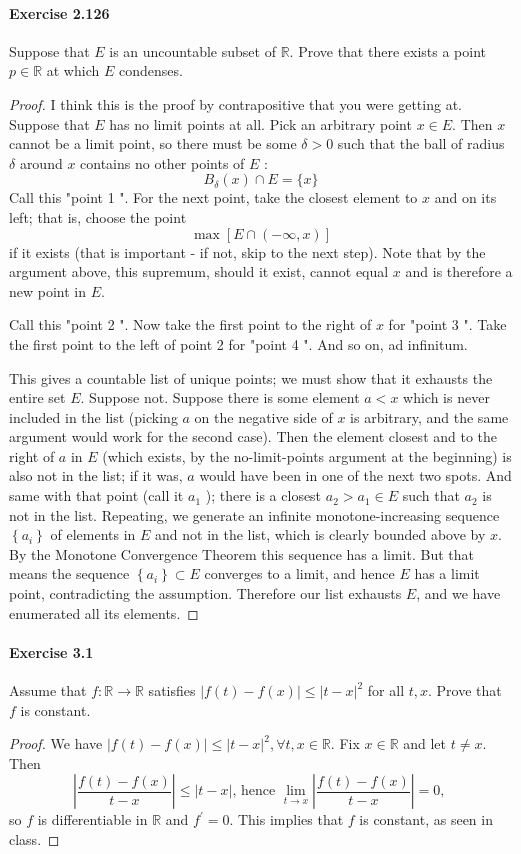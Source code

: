 \documentclass{article}
\begin{document}
\paragraph{Exercise 2.126} Suppose that $E$ is an uncountable subset of $\mathbb{R}$. Prove that there exists a point $p \in \mathbb{R}$ at which $E$ condenses.
\begin{proof}
    I think this is the proof by contrapositive that you were getting at.
Suppose that $E$ has no limit points at all. Pick an arbitrary point $x \in E$. Then $x$ cannot be a limit point, so there must be some $\delta>0$ such that the ball of radius $\delta$ around $x$ contains no other points of $E$ :
$$
B_\delta(x) \cap E=\{x\}
$$
Call this "point 1 ". For the next point, take the closest element to $x$ and on its left; that is, choose the point
$$
\max [E \cap(-\infty, x)]
$$
if it exists (that is important - if not, skip to the next step). Note that by the argument above, this supremum, should it exist, cannot equal $x$ and is therefore a new point in $E$.

Call this "point 2 ". Now take the first point to the right of $x$ for "point 3 ". Take the first point to the left of point 2 for "point 4 ". And so on, ad infinitum.

This gives a countable list of unique points; we must show that it exhausts the entire set $E$. Suppose not. Suppose there is some element $a<x$ which is never included in the list (picking $a$ on the negative side of $x$ is arbitrary, and the same argument would work for the second case). Then the element closest and to the right of $a$ in $E$ (which exists, by the no-limit-points argument at the beginning) is also not in the list; if it was, $a$ would have been in one of the next two spots. And same with that point (call it $a_1$ ); there is a closest $a_2>a_1 \in E$ such that $a_2$ is not in the list. Repeating, we generate an infinite monotone-increasing sequence $\left\{a_i\right\}$ of elements in $E$ and not in the list, which is clearly bounded above by $x$. By the Monotone
Convergence Theorem this sequence has a limit. But that means the sequence $\left\{a_i\right\} \subset E$ converges to a limit, and hence $E$ has a limit point, contradicting the assumption. Therefore our list exhausts $E$, and we have enumerated all its elements.
\end{proof}


\paragraph{Exercise 3.1} Assume that $f \colon \mathbb{R} \rightarrow \mathbb{R}$ satisfies $|f(t)-f(x)| \leq|t-x|^{2}$ for all $t, x$. Prove that $f$ is constant.
\begin{proof}
    We have $|f(t)-f(x)| \leq|t-x|^2, \forall t, x \in \mathbb{R}$. Fix $x \in \mathbb{R}$ and let $t \neq x$. Then
$$
\left|\frac{f(t)-f(x)}{t-x}\right| \leq|t-x| \text {, hence } \lim _{t \rightarrow x}\left|\frac{f(t)-f(x)}{t-x}\right|=0 \text {, }
$$
so $f$ is differentiable in $\mathbb{R}$ and $f^{\prime}=0$. This implies that $f$ is constant, as seen in class.
\end{proof}
\end{document}
